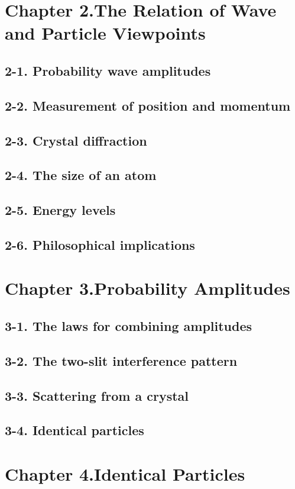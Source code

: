 \documentclass{article}
\begin{document}
\section{Chapter 2.The Relation of Wave and Particle Viewpoints}
\subsection{2-1. Probability wave amplitudes}
\subsection{2-2. Measurement of position and momentum}
\subsection{2-3. Crystal diffraction}
\subsection{2-4. The size of an atom}
\subsection{2-5. Energy levels}
\subsection{2-6. Philosophical implications}
\section{Chapter 3.Probability Amplitudes}
\subsection{3-1. The laws for combining amplitudes}
\subsection{3-2. The two-slit interference pattern}
\subsection{3-3. Scattering from a crystal}
\subsection{3-4. Identical particles}
\section{Chapter 4.Identical Particles}
\end{document}
